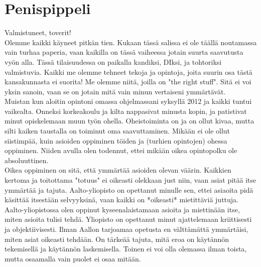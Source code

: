 \documentclass[a4paper, 12pt, finnish]{report}
\newcommand{\topic}{Penispippeli}
\begin{document}
\section*{\topic}
Valmistuneet, toverit!\\

Olemme kaikki käyneet pitkän tien. Kukaan tässä salissa ei ole täällä noutamassa vain turhaa paperia, vaan kaikilla on tässä vaiheessa jotain suurta saavutusta vyön alla. Tässä tilaisuudessa on paikalla kandiksi, DIksi, ja tohtoriksi valmistuvia. Kaikki me olemme tehneet tekoja ja opintoja, joita suurin osa tästä kansakunnasta ei suorita! Me olemme niitä, joilla on "the right stuff". Sitä ei voi yksin sanoin, vaan se on jotain mitä vain minun vertaiseni ymmärtävät.\\

Muistan kun aloitin opintoni omassa ohjelmassani syksyllä 2012 ja kaikki tuntui vaikealta. Onneksi korkeakoulu ja kilta nappasivat minusta kopin, ja patistivat minut opiskelemaan muun työn ohella. Oheistoiminta on ja on ollut kivaa, mutta silti kaiken taustalla on toiminut oma saavuttaminen. Mikään ei ole ollut siistimpää, kuin asioiden oppiminen töiden ja (turhien opintojen) ohessa oppiminen. Niiden avulla olen todennut, ettei mikään oikea opintopolku ole absoluuttinen.\\

Oikea oppiminen on sitä, että ymmärtää asioiden olevan väärin. Kaikkien kertoma ja toitottama "totuus" ei oikeasti olekkaan just niin, vaan asiat pitää itse ymmärtää ja tajuta. Aalto-yliopisto on opettanut minulle sen, ettei asiaoita pidä käsittää itsestään selvyyksinä, vaan kaikki on *oikeasti* mietittäviä juttuja.\\

Aalto-yliopistossa olen oppinut kyseenalaistamaan asioita ja miettinään itse, miten asioita tulisi tehdä. Yliopisto on opettanut minut ajattelemaan kriittisesti ja objektiivisesti. Ilman Aallon tarjoamaa opetusta en välttämättä ymmärtäisi, miten asiat oikeasti tehdään. On tärkeää tajuta, mitä eroa on käytännön tekemisellä ja käytännön laskemisella. Toinen ei voi olla olemassa ilman toista, mutta osaamalla vain puolet ei osaa mitään.\\
\end{document}
